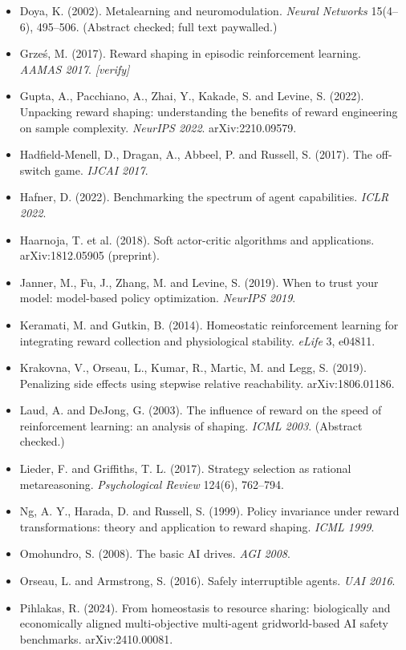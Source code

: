 \documentclass[11pt]{article}
\begin{document}
\begin{itemize}
\item Doya, K. (2002). Metalearning and neuromodulation. \textit{Neural Networks} 15(4--6), 495--506. (Abstract checked; full text paywalled.)
\item Grześ, M. (2017). Reward shaping in episodic reinforcement learning. \textit{AAMAS 2017}. \textit{[verify]}
\item Gupta, A., Pacchiano, A., Zhai, Y., Kakade, S. and Levine, S. (2022). Unpacking reward shaping: understanding the benefits of reward engineering on sample complexity. \textit{NeurIPS 2022}. arXiv:2210.09579.
\item Hadfield-Menell, D., Dragan, A., Abbeel, P. and Russell, S. (2017). The off-switch game. \textit{IJCAI 2017}.
\item Hafner, D. (2022). Benchmarking the spectrum of agent capabilities. \textit{ICLR 2022}.
\item Haarnoja, T. et al. (2018). Soft actor-critic algorithms and applications. arXiv:1812.05905 (preprint).
\item Janner, M., Fu, J., Zhang, M. and Levine, S. (2019). When to trust your model: model-based policy optimization. \textit{NeurIPS 2019}.
\item Keramati, M. and Gutkin, B. (2014). Homeostatic reinforcement learning for integrating reward collection and physiological stability. \textit{eLife} 3, e04811.
\item Krakovna, V., Orseau, L., Kumar, R., Martic, M. and Legg, S. (2019). Penalizing side effects using stepwise relative reachability. arXiv:1806.01186.
\item Laud, A. and DeJong, G. (2003). The influence of reward on the speed of reinforcement learning: an analysis of shaping. \textit{ICML 2003}. (Abstract checked.)
\item Lieder, F. and Griffiths, T. L. (2017). Strategy selection as rational metareasoning. \textit{Psychological Review} 124(6), 762--794.
\item Ng, A. Y., Harada, D. and Russell, S. (1999). Policy invariance under reward transformations: theory and application to reward shaping. \textit{ICML 1999}.
\item Omohundro, S. (2008). The basic AI drives. \textit{AGI 2008}.
\item Orseau, L. and Armstrong, S. (2016). Safely interruptible agents. \textit{UAI 2016}.
\item Pihlakas, R. (2024). From homeostasis to resource sharing: biologically and economically aligned multi-objective multi-agent gridworld-based AI safety benchmarks. arXiv:2410.00081.

\end{itemize}
\end{document}
